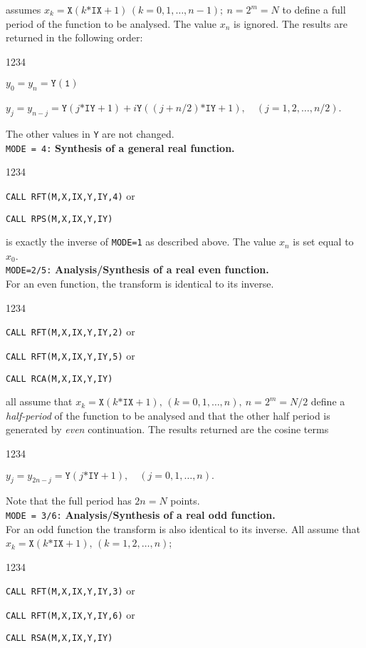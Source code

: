 assumes $x_k =\mathtt{X}(k\mathtt{*IX}+1)\,(k=0,1,\ldots,n-1); \
n=2^m=N$ to define a full period of the function to be analysed.
The value $x_n$ is ignored. The results are returned in the following
order:
\begin{DLtt}{1234}
\item[] $y_0=y_n=\mathtt{Y(1)}$
\item[] $y_j=y_{n-j}=\mathtt{Y}(j\mathtt{*IY}+1)+
i\mathtt{Y}((j+n/2)\mathtt{*IY}+1), \quad (j=1,2,\ldots,n/2)$.
\end{DLtt}
The other values in {\tt Y} are not changed.\\
\newpage
{\tt MODE = 4:} {\bf Synthesis of a general real function.}
\begin{DLtt}{1234}
\item[] {\tt CALL RFT(M,X,IX,Y,IY,4)} \qquad or
\item[] {\tt CALL RPS(M,X,IX,Y,IY)}
\end{DLtt}
is exactly the inverse of {\tt MODE=1} as described above. The value
$x_n$ is set equal to $x_0$. \\[3mm]
{\tt MODE=2/5:} {\bf Analysis/Synthesis of a real even function.} \\
For an even function, the transform is identical to its inverse.
\begin{DLtt}{1234}
\item[] {\tt CALL RFT(M,X,IX,Y,IY,2)} \qquad or
\item[] {\tt CALL RFT(M,X,IX,Y,IY,5)} \qquad or
\item[] {\tt CALL RCA(M,X,IX,Y,IY)}
\end{DLtt}
all assume that $x_k=\mathtt{X}(k\mathtt{*IX}+1),\,(k=0,1,\ldots,n), \
n=2^m=N/2$ define a {\it half-period} of the function to be
analysed and that the other half period is generated by {\it even}
continuation. The results returned are the cosine terms
\begin{DLtt}{1234}
\item $y_j=y_{2n-j}=\mathtt{Y}(j\mathtt{*IY}+1), \quad (j=0,1,\ldots,n).$
\end{DLtt}
Note that the full period has $2n=N$ points. \\ [3mm]
{\tt MODE = 3/6:} {\bf Analysis/Synthesis of a real odd function.} \\
For an odd function the transform is also identical to its inverse.
All assume that
$x_k=\mathtt{X}(k\mathtt{*IX}+1),\,(k=1,2,\ldots,n)$;
\begin{DLtt}{1234}
\item[] {\tt CALL RFT(M,X,IX,Y,IY,3)} \qquad or
\item[] {\tt CALL RFT(M,X,IX,Y,IY,6)} \qquad or
\item[] {\tt CALL RSA(M,X,IX,Y,IY)}
\end{DLtt}
